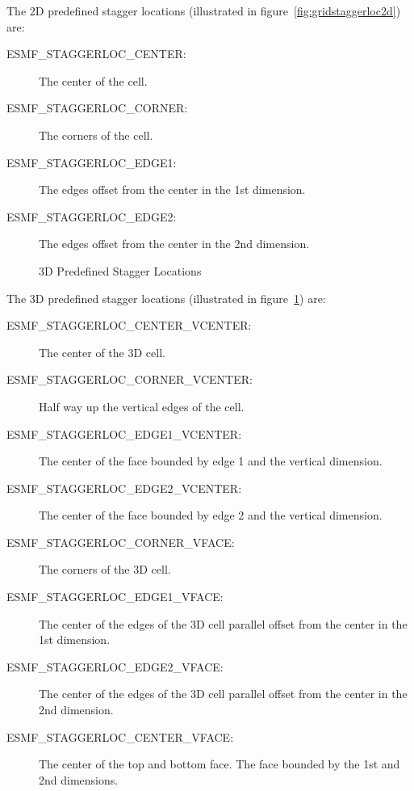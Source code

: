 The 2D predefined stagger locations (illustrated in figure~\ref{fig:gridstaggerloc2d}) are:\\
\begin{description}
\item [ESMF\_STAGGERLOC\_CENTER:] The center of the cell.
\item [ESMF\_STAGGERLOC\_CORNER:] The corners of the cell.
\item [ESMF\_STAGGERLOC\_EDGE1:] The edges offset from the center in the 1st dimension.
\item [ESMF\_STAGGERLOC\_EDGE2:] The edges offset from the center in the 2nd dimension.
\end{description}

\medskip

\begin{center}
\begin{figure}
\center
{}
\caption{3D Predefined Stagger Locations}
\label{fig:gridstaggerloc3d}
\end{figure}
\end{center}

The 3D predefined stagger locations (illustrated in figure~\ref{fig:gridstaggerloc3d}) are:\\
\begin{description}
\item [ESMF\_STAGGERLOC\_CENTER\_VCENTER:] The center of the 3D cell.
\item [ESMF\_STAGGERLOC\_CORNER\_VCENTER:] Half way up the vertical edges of the cell.
\item [ESMF\_STAGGERLOC\_EDGE1\_VCENTER:] The center of the face bounded by edge 1 and the vertical dimension.
\item [ESMF\_STAGGERLOC\_EDGE2\_VCENTER:] The center of the face bounded by edge 2 and the vertical dimension. 
\item [ESMF\_STAGGERLOC\_CORNER\_VFACE:] The corners of the 3D cell.
\item [ESMF\_STAGGERLOC\_EDGE1\_VFACE:] The center of the edges of the 3D cell parallel offset from the center in the 1st dimension.
\item [ESMF\_STAGGERLOC\_EDGE2\_VFACE:] The center of the edges of the 3D cell parallel offset from the center in the 2nd dimension.
\item [ESMF\_STAGGERLOC\_CENTER\_VFACE:] The center of the top and bottom face. The face bounded by the 1st and 2nd dimensions. 
\end{description}


